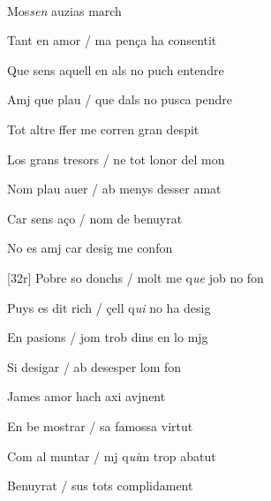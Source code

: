 \documentclass[12pt]{article}
\renewcommand{\espaiAbansEtiquetaPoema}{\vspace{0ex}}
\begin{document}
\begin{estrofa}

\espaiAbansEtiquetaPoema

\\

\begin{rubrica}

Mos\textit{sen} auzias march

\end{rubrica}

\end{estrofa}


\begin{estrofa}

 Tant en amor / ma pen\c{c}a ha consentit

 Que sens aquell en als no puch entendre

 Amj que plau / que dals no pusca pendre

 Tot altre ffer me corren gran despit

 Los grans tresors / ne tot lonor del mon

 Nom plau auer / ab menys desser amat

 Car sens a\c{c}o / nom de benuyrat

 No es amj car desig me confon

\end{estrofa}



\begin{estrofa}

 [32r] Pobre so donchs / molt me q\textit{ue} job no fon

 Puys es dit rich / \c{c}ell q\textit{ui} no ha desig

 En pasions / jom trob dins en lo mjg

 Si desigar / ab desesper lom fon

 James amor hach axi avjnent

 En be mostrar / sa famossa virtut

 Com al muntar / mj q\textit{ui}m trop abatut

 Benuyrat / sus tots complidament

\end{estrofa}
\end{document}
